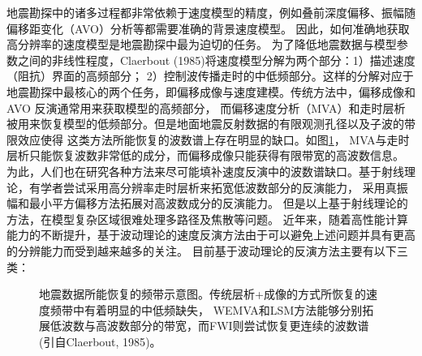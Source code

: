 地震勘探中的诸多过程都非常依赖于速度模型的精度，例如叠前深度偏移、振幅随偏移距变化（AVO）分析等都需要准确的背景速度模型。
因此，如何准确地获取高分辨率的速度模型是地震勘探中最为迫切的任务。
为了降低地震数据与模型参数之间的非线性程度，Claerbout (1985)\cite{Claerbout1985Imaging}将速度模型分解为两个部分：1）描述速度（阻抗）界面的高频部分；
2）控制波传播走时的中低频部分。这样的分解对应于地震勘探中最核心的两个任务，即偏移成像与速度建模。传统方法中，偏移成像和AVO
反演通常用来获取模型的高频部分，
而偏移速度分析（MVA）和走时层析被用来恢复模型的低频部分。但是地面地震反射数据的有限观测孔径以及子波的带限效应使得
这类方法所能恢复的波数谱上存在明显的缺口。如图\ref{fig:GapInSeisVel}，
MVA与走时层析只能恢复波数非常低的成分，而偏移成像只能获得有限带宽的高波数信息。
为此，人们也在研究各种方法来尽可能填补速度反演中的波数谱缺口。基于射线理论，有学者尝试采用高分辨率走时层析来拓宽低波数部分的反演能力，
采用真振幅和最小平方偏移方法拓展对高波数成分的反演能力。
但是以上基于射线理论的方法，在模型复杂区域很难处理多路径及焦散等问题。
近年来，随着高性能计算能力的不断提升，基于波动理论的速度反演方法由于可以避免上述问题并具有更高的分辨能力而受到越来越多的关注。
目前基于波动理论的反演方法主要有以下三类：
\begin{figure}[t] 
   \centering 
   \caption{地震数据所能恢复的频带示意图。传统层析+成像的方式所恢复的速度频带中有着明显的中低频缺失，
	   WEMVA和LSM方法能够分别拓展低波数与高波数部分的带宽，而FWI则尝试恢复更连续的波数谱(引自Claerbout, 1985\cite{Claerbout1985Imaging})。}
   \label{fig:GapInSeisVel}
\end{figure}

